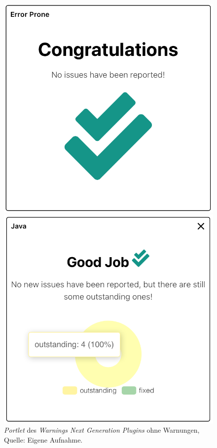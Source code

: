 {\begin{figure}[H]
\begin{minipage}[t]{0.45\textwidth}
\centering
\includegraphics[width=\textwidth]{source/images/warning1}
\caption[\textit{Portlet} des \textit{Warnings Next Generation Plugins} ohne Warnungen.]{\textit{Portlet} des \textit{Warnings Next Generation Plugins} ohne Warnungen, Quelle: Eigene Aufnahme.}
\label{fig:warning1}
\end{minipage}
\hspace{0.5cm}
\begin{minipage}[t]{0.45\textwidth}
\centering
\includegraphics[width=\textwidth]{source/images/warning2}

\end{minipage}
\end{figure}}
